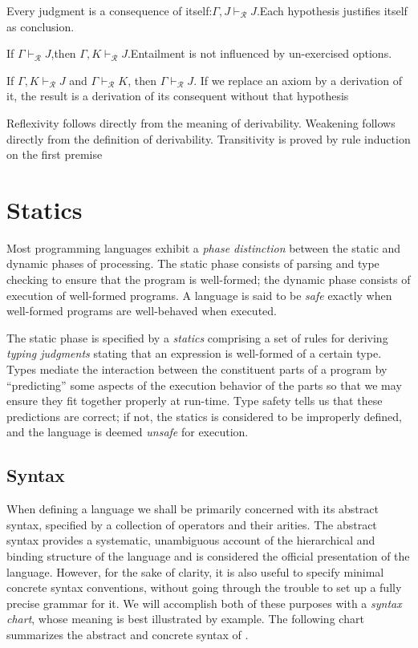 \begin{property}[Reflexivity]
    Every judgment is a consequence of itself:$\Gamma, J \vdash_\mathcal{R} J$.Each hypothesis justifies itself as conclusion.
\end{property}

\begin{property}[Weakening]
  If $\Gamma \vdash_\mathcal{R} J$,then $\Gamma, K \vdash_\mathcal{R} J$.Entailment  is  not  influenced  by  un-exercised options.
\end{property}

\begin{property}[Transitivity]
  If $\Gamma, K \vdash_\mathcal{R} J$ and $\Gamma \vdash_\mathcal{R} K$, then $\Gamma \vdash_\mathcal{R} J$. If we replace an axiom  by a derivation of it, the result is a derivation of its consequent without that  hypothesis
\end{property}

Reflexivity follows directly from the meaning of derivability. Weakening follows directly
from the definition of derivability. Transitivity is proved by rule induction on the first
premise

\section{Statics}
Most programming languages exhibit a \textit{phase distinction} between the static and dynamic phases of processing. The static phase consists of parsing and type checking to ensure that the program is well-formed; the dynamic phase consists of execution of well-formed programs. A language is said to be \textit{safe} exactly when well-formed programs are well-behaved when executed.

The static phase is specified by a \textit{statics} comprising a set of rules for deriving \textit{typing judgments} stating that an expression is well-formed of a certain type. Types mediate the interaction between the constituent parts of a program by “predicting” some aspects of the execution behavior of the parts so that we may ensure they fit together properly at
run-time. Type safety tells us that these predictions are correct; if not, the statics is considered to be improperly defined, and the language is deemed \textit{unsafe} for execution.

\subsection{Syntax}
When defining a language we shall be primarily concerned with its abstract syntax,
specified by a collection of operators and their arities. The abstract syntax
provides a systematic, unambiguous account of the hierarchical and binding
structure of the language and is considered the official presentation of the language.
However, for the sake of clarity, it is also useful to specify minimal concrete syntax
conventions, without going through the trouble to set up a fully precise grammar for
it.
We will accomplish both of these purposes with a \textit{syntax chart}, whose meaning is
best illustrated by example. The following chart summarizes the abstract and concrete
syntax of .

